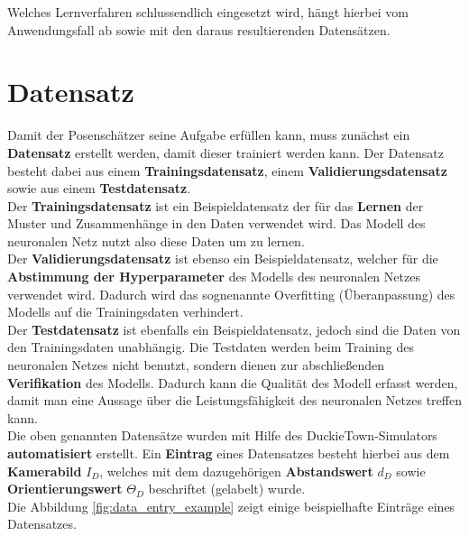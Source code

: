 Welches Lernverfahren schlussendlich eingesetzt wird, hängt hierbei vom Anwendungsfall ab sowie mit den daraus resultierenden Datensätzen.

\section{Datensatz}

Damit der Posenschätzer seine Aufgabe erfüllen kann, muss zunächst ein \textbf{Datensatz} erstellt werden, damit dieser trainiert werden kann. Der Datensatz besteht dabei aus einem \textbf{Trainingsdatensatz}, einem \textbf{Validierungsdatensatz} sowie aus einem \textbf{Testdatensatz}. \\

Der \textbf{Trainingsdatensatz} ist ein Beispieldatensatz der für das \textbf{Lernen} der Muster und Zusammenhänge in den Daten verwendet wird. Das Modell des neuronalen Netz nutzt also diese Daten um zu lernen. \cite{datasolut} \\

Der \textbf{Validierungsdatensatz} ist ebenso ein Beispieldatensatz, welcher für die \textbf{Abstimmung der Hyperparameter} des Modells des neuronalen Netzes verwendet wird. Dadurch wird das sognenannte \glqq Overfitting\grqq{} (Überanpassung) des Modells auf die Trainingsdaten verhindert. \cite{datasolut} \\

Der \textbf{Testdatensatz} ist ebenfalls ein Beispieldatensatz, jedoch sind die Daten von den Trainingsdaten unabhängig. Die Testdaten werden beim Training des neuronalen Netzes nicht benutzt, sondern dienen zur abschließenden \textbf{Verifikation} des Modells. Dadurch kann die Qualität des Modell erfasst werden, damit man eine Aussage über die Leistungsfähigkeit des neuronalen Netzes treffen kann. \cite{datasolut} \\

Die oben genannten Datensätze wurden mit Hilfe des DuckieTown-Simulators \textbf{automatisiert} erstellt. Ein \textbf{Eintrag} eines Datensatzes besteht hierbei aus dem \textbf{Kamerabild} $I_D$, welches mit dem dazugehörigen \textbf{Abstandswert} $d_D$ sowie \textbf{Orientierungswert} $\Theta_D$ beschriftet (\glqq gelabelt\grqq) wurde. \\

Die Abbildung \ref{fig:data_entry_example} zeigt einige beispielhafte Einträge eines Datensatzes.

